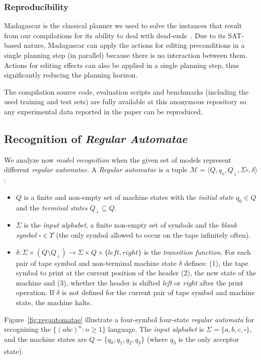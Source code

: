 \documentclass[letterpaper]{article} %
\newcommand{\tup}[1]{{\langle #1 \rangle}}
\begin{document}
\subsubsection{Reproducibility}
{\sc Madagascar} is the classical planner we used to solve the instances that result from our compilations for its ability to deal with dead-ends~\cite{rintanen2014madagascar}. Due to its SAT-based nature, {\sc Madagascar} can apply the actions for editing preconditions in a single planning step (in parallel) because there is no interaction between them. Actions for editing effects can also be applied in a single planning step, thus significantly reducing the planning horizon.

The compilation source code, evaluation scripts and benchmarks (including the used training and test sets) are fully available at this anonymous repository {\em } so any experimental data reported in the paper can be reproduced.

\subsection{Recognition of {\em Regular Automatae}}
We analyze now {\em model recognition} when the given set of models represent different {\em regular automatae}. A {\em Regular automatae} is a tuple $\mathcal{M}=\tup{Q,q_o,Q_{\bot},\Sigma\square,\delta}$:
\begin{itemize}
\item $Q$ is a finite and non-empty set of machine states with the {\em initial state} $q_0\in Q$ and the {\em terminal states} $Q_{\bot}\subseteq Q$.  
\item $\Sigma$ is the {\em input alphabet}, a finite non-empty set of symbols and the {\em blank symbol} $\square\in\Upsilon$ (the only symbol allowed to occur on the tape infinitely often).
\item $\delta: \Sigma\times (Q\setminus Q_{\bot}) \rightarrow \Sigma\times Q\times\{left,right\}$ is the {\em transition function}. For each pair of tape symbol and non-terminal machine state $\delta$ defines: (1), the tape symbol to print at the current position of the header (2), the new state of the machine and (3), whether the header is shifted {\em left} or {\em right} after the print operation. If $\delta$ is not defined for the current pair of tape symbol and machine state, the machine halts.
\end{itemize}

Figure~\ref{fig:regautomatae} illustrate a four-symbol four-state {\em regular automata} for recognizing the $\{(abc)^n : n \geq 1 \}$ language. The {\em input alphabet} is $\Sigma=\{a,b,c,\square\}$, and the machine states are $Q=\{q_0,q_1,q_2,\underline{q_3}\}$ (where \underline{$q_3$} is the only acceptor state).
\end{document}
